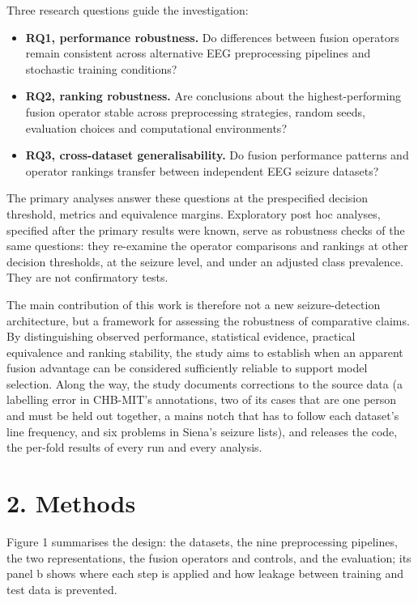 \documentclass[11pt,a4paper]{article}
\providecommand{\tightlist}{%
  \setlength{\itemsep}{0pt}\setlength{\parskip}{0pt}}
\begin{document}
Three research questions guide the investigation:

\begin{itemize}
\tightlist
\item
  \textbf{RQ1, performance robustness.} Do differences between fusion operators remain
  consistent across alternative EEG preprocessing pipelines and stochastic training
  conditions?
\item
  \textbf{RQ2, ranking robustness.} Are conclusions about the highest-performing fusion
  operator stable across preprocessing strategies, random seeds, evaluation choices and
  computational environments?
\item
  \textbf{RQ3, cross-dataset generalisability.} Do fusion performance patterns and operator
  rankings transfer between independent EEG seizure datasets?
\end{itemize}

The primary analyses answer these questions at the prespecified decision threshold,
metrics and equivalence margins. Exploratory post hoc analyses, specified after the
primary results were known, serve as robustness checks of the same questions: they
re-examine the operator comparisons and rankings at other decision thresholds, at the
seizure level, and under an adjusted class prevalence. They are not confirmatory tests.

The main contribution of this work is therefore not a new seizure-detection
architecture, but a framework for assessing the robustness of comparative claims. By
distinguishing observed performance, statistical evidence, practical equivalence and
ranking stability, the study aims to establish when an apparent fusion advantage can be
considered sufficiently reliable to support model selection. Along the way, the study
documents corrections to the source data (a labelling error in CHB-MIT's annotations, two
of its cases that are one person and must be held out together, a mains notch that has
to follow each dataset's line frequency, and six problems in Siena's seizure lists), and
releases the code, the per-fold results of every run and every analysis.

\section{2. Methods}\label{methods}

Figure 1 summarises the design: the
datasets, the nine preprocessing pipelines, the two representations, the fusion
operators and controls, and the evaluation; its panel b shows where each step is
applied and how leakage between training and test data is prevented.
\end{document}

